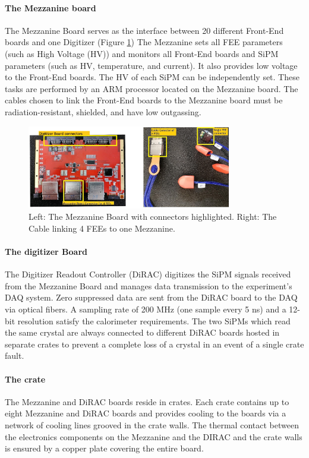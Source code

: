 \paragraph{The Mezzanine board}
The Mezzanine Board serves as the interface between 20 different 
Front-End boards and one Digitizer (Figure \ref{fig:mezzanine}) 
The Mezzanine sets all FEE parameters (such as High Voltage (HV)) and 
monitors all Front-End boards and SiPM parameters (such as HV, temperature, and current). 
It also provides low voltage to the Front-End boards. The HV of each SiPM can be 
independently set. These tasks are performed by an ARM processor located on the 
Mezzanine board. The cables chosen to link the Front-End boards to the 
Mezzanine board must be radiation-resistant, shielded, and have low outgassing. 
\begin{figure}[!h]
    \centering
    \includegraphics[width =0.8\textwidth]{figures/png/Screenshot_20240706_144234.png}
    \caption[The calorimeter Mezzanine Board and FEE.]{Left: The Mezzanine Board with connectors highlighted. 
    Right: The Cable linking 4 FEEs to one Mezzanine.}
    \label{fig:mezzanine}
\end{figure}



\paragraph{The digitizer Board}
The Digitizer Readout Controller (DiRAC) digitizes the SiPM 
signals received from the Mezzanine Board and manages data 
transmission to the experiment's DAQ system. Zero suppressed 
data are sent from the DiRAC board to the DAQ via optical fibers. 
A sampling rate of 200 MHz (one sample every 5 ns) and a 12-bit resolution 
satisfy the calorimeter requirements. The two SiPMs which read the same 
crystal are always connected to different DiRAC boards hosted in separate 
crates to prevent a complete loss of a crystal 
in an event of a single crate fault.

\paragraph{The crate}
The Mezzanine and DiRAC boards reside in crates.
Each crate contains up to eight Mezzanine 
and DiRAC boards and provides cooling to the boards via a network of cooling lines grooved in the crate walls.
The thermal contact between the electronics components on the Mezzanine and the DIRAC
and the crate walls is ensured by a copper plate covering the entire board.
